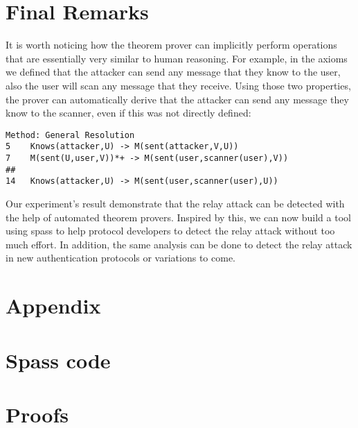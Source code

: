 \documentclass{article}
\begin{document}
\section{Final Remarks}
	It is worth noticing how the theorem prover can implicitly perform operations
	that are essentially very similar to human reasoning. For example, in the 
	axioms we defined that the attacker can send any message that they know to the user,
	also the user will scan any message that they receive. Using those two properties,
	the prover can automatically derive that the attacker can send any message they know
	to the scanner, even if this was not directly defined:
\lstset{basicstyle=\ttfamily\footnotesize,breaklines=true}
\begin{lstlisting}[frame=single]
Method: General Resolution
5	 Knows(attacker,U) -> M(sent(attacker,V,U))
7	 M(sent(U,user,V))*+ -> M(sent(user,scanner(user),V))
##
14	 Knows(attacker,U) -> M(sent(user,scanner(user),U))
\end{lstlisting}

	Our experiment's result demonstrate that the relay attack can be detected
	with the help of automated theorem provers. 
	Inspired by this, we can now build a tool using spass to
	help protocol developers to detect the relay attack without too much
	effort. In addition, the same analysis can be done to detect the relay
	attack in new authentication protocols or variations to come.

\section{Appendix}
\appendix

\section{Spass code}
\lstset{basicstyle=\ttfamily\footnotesize,breaklines=true}





\section{Proofs}






\end{document}
